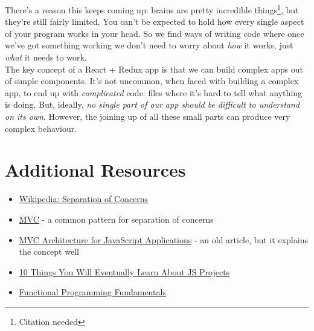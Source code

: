 There's a reason this keeps coming up: brains are pretty incredible things\footnote{Citation needed}, but they're still fairly limited. You can't be expected to hold how every single aspect of your program works in your head. So we find ways of writing code where once we've got something working we don't need to worry about \textit{how} it works, just \textit{what} it needs to work.
\\

The key concept of a React + Redux app is that we can build complex apps out of simple components. It's not uncommon, when faced with building a complex app, to end up with \textit{complicated} code: files where it's hard to tell what anything is doing. But, ideally, \textit{no single part of our app should be difficult to understand on its own}. However, the joining up of all these small parts can produce very complex behaviour.



\section{Additional Resources}

\begin{itemize}[leftmargin=*]
    \item \href{https://en.wikipedia.org/wiki/Separation_of_concerns}{Wikipedia: Separation of Concerns}
    \item \href{https://en.wikipedia.org/wiki/Model–view–controller}{MVC} - a common pattern for separation of concerns
    \item \href{http://peter.michaux.ca/articles/mvc-architecture-for-javascript-applications}{MVC Architecture for JavaScript Applications} - an old article, but it explains the concept well
    \item \href{https://blog.usejournal.com/10-things-you-will-eventually-learn-about-javascript-projects-efd7646b958a}{10 Things You Will Eventually Learn About JS Projects}
    \item \href{https://www.matthewgerstman.com/functional-programming-fundamentals/}{Functional Programming Fundamentals}
\end{itemize}
